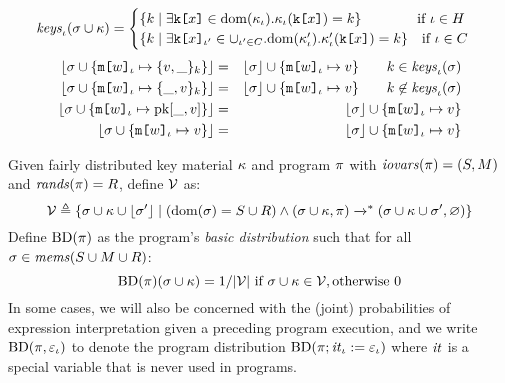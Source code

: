 \begin{definition}[Patterns]
  $$
  \mathit{keys}_{\iota}(\sigma \cup \kappa) =
  \begin{cases}
    \{ k \mid \exists \texttt{k[}x\texttt{]} \in \mathrm{dom}(\kappa_\iota) .  \kappa_\iota(\texttt{k[}x\texttt{]}) = k\} \qquad\qquad \text{if} \ \iota \in H \\
    \{ k \mid \exists \texttt{k[}x\texttt{]}_{\iota'} \in \cup_{\iota' \in C} . \mathrm{dom}(\kappa_\iota') .  \kappa_\iota'(\texttt{k[}x\texttt{]}) = k \} \quad \text{if}\ \iota \in C
  \end{cases}
  $$
  \begin{eqnarray*}
    \lfloor \sigma \cup \{ \texttt{m[}w\texttt{]}_{\iota} \mapsto \{ v,\_ \}_{k} \} \rfloor &=&
    \lfloor \sigma \rfloor \cup \{ \texttt{m[}w\texttt{]}_{\iota} \mapsto v \} \qquad k \in \mathit{keys}_{\iota}(\sigma)\\
    \lfloor \sigma \cup \{ \texttt{m[}w\texttt{]}_{\iota} \mapsto \{ \_,v \}_{k} \} \rfloor &=&
    \lfloor \sigma \rfloor \cup \{ \texttt{m[}w\texttt{]}_{\iota} \mapsto v \} \qquad k \not\in \mathit{keys}_{\iota}(\sigma)\\
    \lfloor \sigma \cup \{ \texttt{m[}w\texttt{]}_{\iota} \mapsto \mathrm{pk}[\_,v]\} \rfloor &=&
    \lfloor \sigma \rfloor \cup \{ \texttt{m[}w\texttt{]}_{\iota} \mapsto v \} \\
    \lfloor \sigma \cup \{ \texttt{m[}w\texttt{]}_{\iota} \mapsto v\} \rfloor &=&
    \lfloor \sigma \rfloor \cup \{ \texttt{m[}w\texttt{]}_{\iota} \mapsto v \} 
  \end{eqnarray*}
\end{definition}

\begin{definition}
  \label{def-progtt}
  \label{definition-progtt}
  Given fairly distributed key material $\kappa$ and program $\pi$ with $\mathit{iovars}(\pi) = (S,M)$ and $\mathit{rands}(\pi) = R$,
  define $\mathcal{V}$ as:
  $$
  \mathcal{V} \triangleq \{ \sigma \cup \kappa \cup \lfloor \sigma' \rfloor \mid (\mathrm{dom}(\sigma) = S \cup R) \wedge (\sigma \cup \kappa,\pi) \xrightarrow{}^{*}
  (\sigma \cup \kappa \cup \sigma',\varnothing) \}
  $$
  Define $\mathrm{BD}(\pi)$ as the program's \emph{basic distribution} such that for all
  $\sigma \in \mathit{mems}(S \cup M \cup R)$:
  $$
  \mathrm{BD}(\pi)(\sigma \cup \kappa) =  1 / |\mathcal{V}| \ \text{if}\ \sigma \cup \kappa \in \mathcal{V}, \text{otherwise}\ 0
  $$
  In some cases, we will also be concerned with the (joint)
  probabilities of expression interpretation given a preceding program
  execution, and we write $\mathrm{BD}(\pi, \varepsilon_{\iota})$ to denote the program
  distribution $\mathrm{BD}(\pi;\mathit{it}_{\iota} := \varepsilon_{\iota})$ where $\mathit{it}$ is a
  special variable that is never used in programs.
\end{definition}

